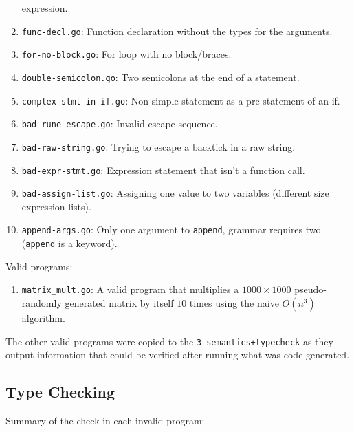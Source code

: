 \documentclass[11pt]{article}
\begin{document}
\begin{enumerate}
  expression.
\item \texttt{func-decl.go}: Function declaration without the types
  for the arguments.
\item \texttt{for-no-block.go}: For loop with no block/braces.
\item \texttt{double-semicolon.go}: Two semicolons at the end of a
  statement.
\item \texttt{complex-stmt-in-if.go}: Non simple statement as a
  pre-statement of an if.
\item \texttt{bad-rune-escape.go}: Invalid escape sequence.
\item \texttt{bad-raw-string.go}: Trying to escape a backtick in a raw
  string.
\item \texttt{bad-expr-stmt.go}: Expression statement that isn't a
  function call.
\item \texttt{bad-assign-list.go}: Assigning one value to two
  variables (different size expression lists).
\item \texttt{append-args.go}: Only one argument to \texttt{append},
  grammar requires two (\texttt{append} is a keyword).
\end{enumerate}
Valid programs:
\begin{enumerate}
\item \texttt{matrix\_mult.go}: A valid program that multiplies a
  $1000 \times 1000$ pseudo-randomly generated matrix by itself $10$
  times using the naive $O(n^3)$ algorithm.
\end{enumerate}
The other valid programs were copied to the
\texttt{3-semantics+typecheck} as they output information that could
be verified after running what was code generated.

\subsection{Type Checking}
\label{sec:atypecheck}

Summary of the check in each invalid program:
\end{document}
